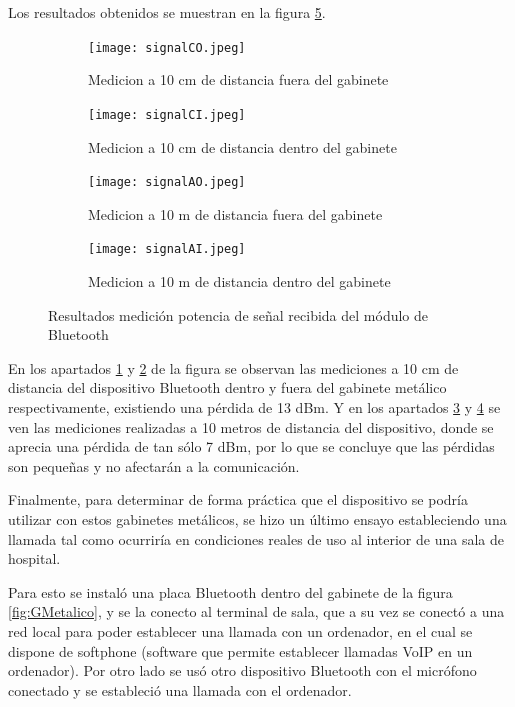 Los resultados obtenidos se muestran en la figura \ref{fig:Psenal}.

\begin{figure}[!h]
	\centering
   	\begin{subfigure}[b]{0.45\textwidth}
   		\centering
      	\texttt{[image: signalCO.jpeg]}
      	\caption{Medicion a 10 cm de distancia fuera del gabinete}
      	\label{fig:PsenalA}
   	\end{subfigure}%
   	\hfill
   	\begin{subfigure}[b]{0.45\textwidth}
   		\centering
      	\texttt{[image: signalCI.jpeg]}
      	\caption{Medicion a 10 cm de distancia dentro del gabinete}
      	\label{fig:PsenalB}
   	\end{subfigure}%
   	\newline
   	\begin{subfigure}[b]{0.45\textwidth}
   		\centering
      	\texttt{[image: signalAO.jpeg]}
      	\caption{Medicion a 10 m de distancia fuera del gabinete}
      	\label{fig:PsenalC}
   	\end{subfigure}%
   	\hfill
   	\begin{subfigure}[b]{0.45\textwidth}
   		\centering
      	\texttt{[image: signalAI.jpeg]}
      	\caption{Medicion a 10 m de distancia dentro del gabinete}
      	\label{fig:PsenalD}
   	\end{subfigure}%
	\caption{Resultados medición potencia de señal recibida del módulo de Bluetooth}
	\label{fig:Psenal}
\end{figure}

En los apartados \ref{fig:PsenalA} y \ref{fig:PsenalB} de la figura se observan las mediciones a 10 cm de distancia del dispositivo Bluetooth dentro y fuera del gabinete metálico respectivamente, existiendo una pérdida de 13 dBm. Y en los apartados \ref{fig:PsenalC} y \ref{fig:PsenalD} se ven las mediciones realizadas a 10 metros de distancia del dispositivo, donde se aprecia una pérdida de tan sólo 7 dBm, por lo que se concluye que las pérdidas son pequeñas y no afectarán a la comunicación.

Finalmente, para determinar de forma práctica que el dispositivo se podría utilizar con estos gabinetes metálicos, se hizo un último ensayo estableciendo una llamada tal como ocurriría  en condiciones reales de uso al interior de una sala de hospital.

Para esto se instaló una placa Bluetooth dentro del gabinete de la figura \ref{fig:GMetalico}, y se la conecto al terminal de sala, que a su vez se conectó a una red local para poder establecer una llamada con un ordenador, en el cual se dispone de softphone (software que permite establecer llamadas VoIP en un ordenador). Por otro lado se usó otro dispositivo Bluetooth con el micrófono conectado y se estableció una llamada con el ordenador.

